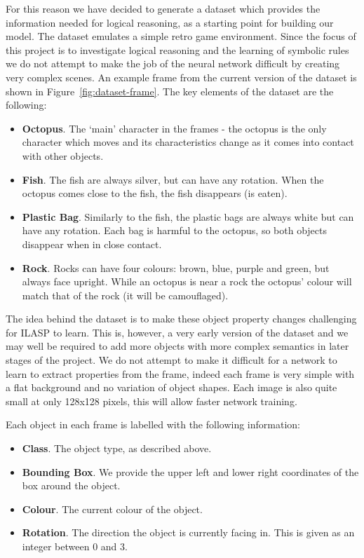 \documentclass[../interim.tex]{subfiles}
\begin{document}
For this reason we have decided to generate a dataset which provides the information needed for logical reasoning, as a starting point for building our model. The dataset emulates a simple retro game environment. Since the focus of this project is to investigate logical reasoning and the learning of symbolic rules we do not attempt to make the job of the neural network difficult by creating very complex scenes. An example frame from the current version of the dataset is shown in Figure~\ref{fig:dataset-frame}. The key elements of the dataset are the following:
\begin{itemize}
  \item \textbf{Octopus}. The `main' character in the frames - the octopus is the only character which moves and its characteristics change as it comes into contact with other objects.

  \item \textbf{Fish}. The fish are always silver, but can have any rotation. When the octopus comes close to the fish, the fish disappears (is eaten).

  \item \textbf{Plastic Bag}. Similarly to the fish, the plastic bags are always white but can have any rotation. Each bag is harmful to the octopus, so both objects disappear when in close contact.

  \item \textbf{Rock}. Rocks can have four colours: brown, blue, purple and green, but always face upright. While an octopus is near a rock the octopus' colour will match that of the rock (it will be camouflaged).
\end{itemize}

The idea behind the dataset is to make these object property changes challenging for ILASP to learn. This is, however, a very early version of the dataset and we may well be required to add more objects with more complex semantics in later stages of the project. We do not attempt to make it difficult for a network to learn to extract properties from the frame, indeed each frame is very simple with a flat background and no variation of object shapes. Each image is also quite small at only 128x128 pixels, this will allow faster network training.

Each object in each frame is labelled with the following information:
\begin{itemize}
  \item \textbf{Class}. The object type, as described above.

  \item \textbf{Bounding Box}. We provide the upper left and lower right coordinates of the box around the object.

  \item \textbf{Colour}. The current colour of the object.

  \item \textbf{Rotation}. The direction the object is currently facing in. This is given as an integer between 0 and 3.
\end{itemize}
\end{document}
